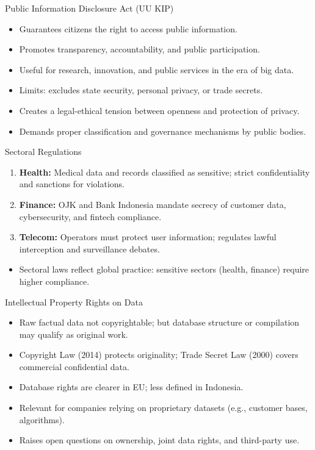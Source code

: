 \documentclass[aspectratio=169, table]{beamer}
\begin{document}
\begin{frame}{Public Information Disclosure Act (UU KIP)}
	\vspace{20pt}
	\begin{itemize}
		\item Guarantees citizens the right to access public information.  
		\item Promotes transparency, accountability, and public participation.  
		\item Useful for research, innovation, and public services in the era of big data.  
		\item Limits: excludes state security, personal privacy, or trade secrets.  
		\item Creates a legal-ethical tension between openness and protection of privacy.  
		\item Demands proper classification and governance mechanisms by public bodies.  
	\end{itemize}
\end{frame}

\begin{frame}{Sectoral Regulations}
	\vspace{20pt}
	\begin{enumerate}
		\item \textbf{Health:} Medical data and records classified as sensitive; strict confidentiality and sanctions for violations.  
		\item \textbf{Finance:} OJK and Bank Indonesia mandate secrecy of customer data, cybersecurity, and fintech compliance.  
		\item \textbf{Telecom:} Operators must protect user information; regulates lawful interception and surveillance debates.  
	\end{enumerate}
	\begin{itemize}
		\item Sectoral laws reflect global practice: sensitive sectors (health, finance) require higher compliance.  
	\end{itemize}
\end{frame}

\begin{frame}{Intellectual Property Rights on Data}
	\vspace{20pt}
	\begin{itemize}
		\item Raw factual data not copyrightable; but database structure or compilation may qualify as original work.  
		\item Copyright Law (2014) protects originality; Trade Secret Law (2000) covers commercial confidential data.  
		\item Database rights are clearer in EU; less defined in Indonesia.  
		\item Relevant for companies relying on proprietary datasets (e.g., customer bases, algorithms).  
		\item Raises open questions on ownership, joint data rights, and third-party use.  
	\end{itemize}
\end{frame}
\end{document}
